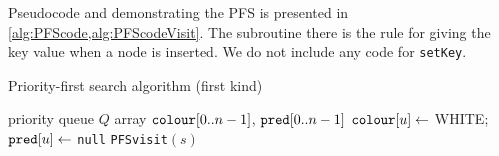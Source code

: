 %
%
%

Pseudocode  and  demonstrating the PFS is presented in \cref{alg:PFScode,alg:PFScodeVisit}. 
The subroutine  there is the rule for giving the key value when a node is inserted. 
We do not include any code for \texttt{setKey}.

\begin{algorithm}[H]
  \caption{Priority-first search algorithm (first kind)}
  \label{alg:PFScode}
\begin{algorithmic}[1]
	\State priority queue $Q$  
	\State array $\operatorname{\text{\texttt{colour}}}[0..n-1]$, $\operatorname{\text{\texttt{pred}}}[0..n-1]$
		\State $\operatorname{\text{\texttt{colour}}}[u] \gets $ WHITE; $\operatorname{\text{\texttt{pred}}}[u] \gets $ \texttt{null}
	\EndFor
			\State \texttt{PFSvisit}$(s)$
		\EndIf
	\EndFor
	\State \Return{$\pred$}
\EndFunction
\end{algorithmic}
\end{algorithm}

